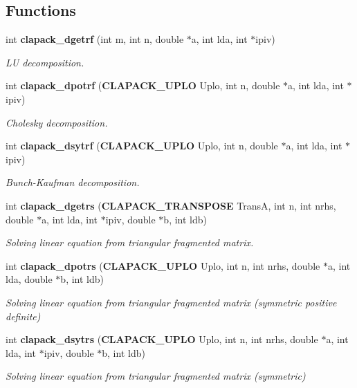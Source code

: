 \subsection*{Functions}
\begin{DoxyCompactItemize}
\item 
int {\bf clapack\-\_\-dgetrf} (int m, int n, double $\ast$a, int lda, int $\ast$ipiv)
\begin{DoxyCompactList}\small\item\em L\-U decomposition. \end{DoxyCompactList}\item 
int {\bf clapack\-\_\-dpotrf} ({\bf C\-L\-A\-P\-A\-C\-K\-\_\-\-U\-P\-L\-O} Uplo, int n, double $\ast$a, int lda, int $\ast$ipiv)
\begin{DoxyCompactList}\small\item\em Cholesky decomposition. \end{DoxyCompactList}\item 
int {\bf clapack\-\_\-dsytrf} ({\bf C\-L\-A\-P\-A\-C\-K\-\_\-\-U\-P\-L\-O} Uplo, int n, double $\ast$a, int lda, int $\ast$ipiv)
\begin{DoxyCompactList}\small\item\em Bunch-\/\-Kaufman decomposition. \end{DoxyCompactList}\item 
int {\bf clapack\-\_\-dgetrs} ({\bf C\-L\-A\-P\-A\-C\-K\-\_\-\-T\-R\-A\-N\-S\-P\-O\-S\-E} Trans\-A, int n, int nrhs, double $\ast$a, int lda, int $\ast$ipiv, double $\ast$b, int ldb)
\begin{DoxyCompactList}\small\item\em Solving linear equation from triangular fragmented matrix. \end{DoxyCompactList}\item 
int {\bf clapack\-\_\-dpotrs} ({\bf C\-L\-A\-P\-A\-C\-K\-\_\-\-U\-P\-L\-O} Uplo, int n, int nrhs, double $\ast$a, int lda, double $\ast$b, int ldb)
\begin{DoxyCompactList}\small\item\em Solving linear equation from triangular fragmented matrix (symmetric positive definite) \end{DoxyCompactList}\item 
int {\bf clapack\-\_\-dsytrs} ({\bf C\-L\-A\-P\-A\-C\-K\-\_\-\-U\-P\-L\-O} Uplo, int n, int nrhs, double $\ast$a, int lda, int $\ast$ipiv, double $\ast$b, int ldb)
\begin{DoxyCompactList}\small\item\em Solving linear equation from triangular fragmented matrix (symmetric) \end{DoxyCompactList}\item 

\end{DoxyCompactItemize}
